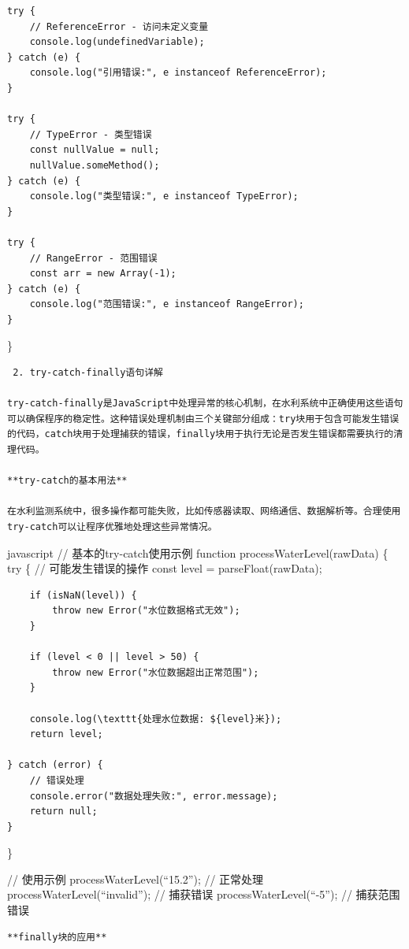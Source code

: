 {\begin{verbatim}
try {
    // ReferenceError - 访问未定义变量
    console.log(undefinedVariable);
} catch (e) {
    console.log("引用错误:", e instanceof ReferenceError);
}

try {
    // TypeError - 类型错误
    const nullValue = null;
    nullValue.someMethod();
} catch (e) {
    console.log("类型错误:", e instanceof TypeError);
}

try {
    // RangeError - 范围错误
    const arr = new Array(-1);
} catch (e) {
    console.log("范围错误:", e instanceof RangeError);
}
\end{verbatim}

\}

\begin{lstlisting}
 2. try-catch-finally语句详解

try-catch-finally是JavaScript中处理异常的核心机制，在水利系统中正确使用这些语句可以确保程序的稳定性。这种错误处理机制由三个关键部分组成：try块用于包含可能发生错误的代码，catch块用于处理捕获的错误，finally块用于执行无论是否发生错误都需要执行的清理代码。

**try-catch的基本用法**

在水利监测系统中，很多操作都可能失败，比如传感器读取、网络通信、数据解析等。合理使用try-catch可以让程序优雅地处理这些异常情况。
\end{lstlisting}

javascript // 基本的try-catch使用示例 function processWaterLevel(rawData) \{ try \{ // 可能发生错误的操作 const level = parseFloat(rawData);

\begin{verbatim}
    if (isNaN(level)) {
        throw new Error("水位数据格式无效");
    }
    
    if (level < 0 || level > 50) {
        throw new Error("水位数据超出正常范围");
    }
    
    console.log(\texttt{处理水位数据: ${level}米});
    return level;
    
} catch (error) {
    // 错误处理
    console.error("数据处理失败:", error.message);
    return null;
}
\end{verbatim}

\}

// 使用示例 processWaterLevel(``15.2''); // 正常处理 processWaterLevel(``invalid''); // 捕获错误 processWaterLevel(``-5''); // 捕获范围错误

\begin{lstlisting}
**finally块的应用**


\end{lstlisting}}
